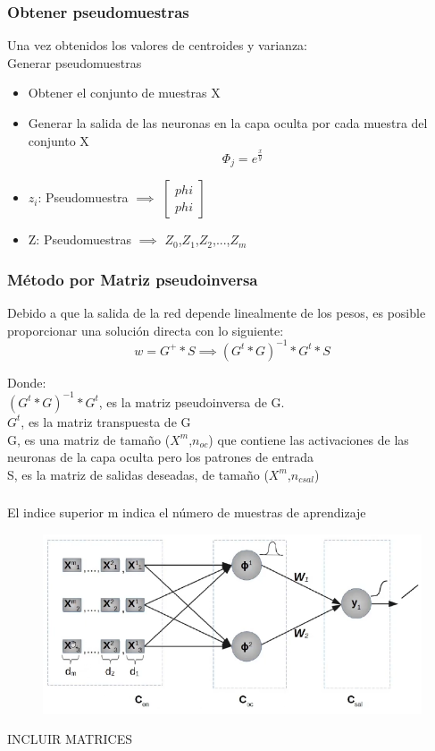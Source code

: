 \documentclass[
	11pt, %
]{beamer}
\begin{document}
\begin{frame}
  \frametitle{Obtener pseudomuestras}

  Una vez obtenidos los valores de centroides y varianza:\\

  Generar pseudomuestras\\
  \begin{itemize}
  \item Obtener el conjunto de muestras X
  \item Generar la salida de las neuronas en la capa oculta por cada muestra del conjunto X
    \[\Phi_{j}=e^{\frac{x}{y}}\]

  \item $z_{i}$: Pseudomuestra $\implies$
    $ \begin{bmatrix}
    phi \\
    phi 
  \end{bmatrix}  $
  \item Z: Pseudomuestras $\implies$ {$Z_{0}$,$Z_{1}$,$Z_{2}$,...,$Z_{m}$}
  \end{itemize}
\end{frame}

\begin{frame}
  \frametitle{Método por Matriz pseudoinversa}
  Debido a que la salida de la red depende linealmente de los pesos, es posible proporcionar una solución directa con lo siguiente:
  \[ w = G^{+} * S \implies (G^{t}*G)^{-1} * G^{t} * S\]

  Donde:\\
  $(G^{t} * G)^{-1} * G^{t}$, es la matriz pseudoinversa de G.\\
  $G^{t}$, es la matriz transpuesta de G\\
  G, es una matriz de tamaño ($X^{m}$,$n_{oc}$) que contiene las activaciones de las neuronas de la capa oculta pero los patrones de entrada\\
  S, es la matriz de salidas deseadas, de tamaño ($X^m$,$n_{csal}$)
  
\end{frame}

\begin{frame}
  \frametitle{}
  El indice superior m indica el número de muestras de aprendizaje
  \begin{figure}
    \includegraphics[width=0.7\linewidth]{rbradial.png}
  \end{figure}

  INCLUIR MATRICES

\end{frame}
\end{document}
